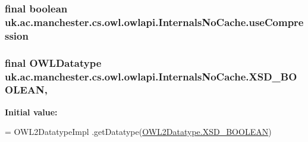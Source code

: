 \hypertarget{classuk_1_1ac_1_1manchester_1_1cs_1_1owl_1_1owlapi_1_1_internals_no_cache_a1beef4bccf6fba4712e20f92f7726b38}{
\subsubsection[{use\-Compression}]{\setlength{\rightskip}{0pt plus 5cm}final boolean uk.\-ac.\-manchester.\-cs.\-owl.\-owlapi.\-Internals\-No\-Cache.\-use\-Compression\hspace{0.3cm}{\ttfamily [private]}}}\label{classuk_1_1ac_1_1manchester_1_1cs_1_1owl_1_1owlapi_1_1_internals_no_cache_a1beef4bccf6fba4712e20f92f7726b38}
\hypertarget{classuk_1_1ac_1_1manchester_1_1cs_1_1owl_1_1owlapi_1_1_internals_no_cache_ac2fda6f87d7991f50048769f853be805}{
\subsubsection[{X\-S\-D\-\_\-\-B\-O\-O\-L\-E\-A\-N}]{\setlength{\rightskip}{0pt plus 5cm}final {\bf O\-W\-L\-Datatype} uk.\-ac.\-manchester.\-cs.\-owl.\-owlapi.\-Internals\-No\-Cache.\-X\-S\-D\-\_\-\-B\-O\-O\-L\-E\-A\-N\hspace{0.3cm}{\ttfamily [static]}, {\ttfamily [private]}}}\label{classuk_1_1ac_1_1manchester_1_1cs_1_1owl_1_1owlapi_1_1_internals_no_cache_ac2fda6f87d7991f50048769f853be805}
{\bfseries Initial value\-:}
\begin{DoxyCode}
= OWL2DatatypeImpl
            .getDatatype(\hyperlink{enumorg_1_1semanticweb_1_1owlapi_1_1vocab_1_1_o_w_l2_datatype_afade6f87183f2d054776b4cb9ff94834}{OWL2Datatype.XSD\_BOOLEAN})
\end{DoxyCode}
